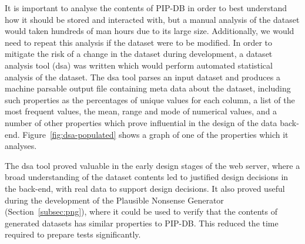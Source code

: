 It is important to analyse the contents of PIP-DB in order to best
understand how it should be stored and interacted with, but a manual
analysis of the dataset would taken hundreds of man hours due to its
large size. Additionally, we would need to repeat this analysis if the
dataset were to be modified. In order to mitigate the risk of a change
in the dataset during development, a dataset analysis tool (dsa) was
written which would perform automated statistical analysis of the
dataset. The dsa tool parses an input dataset and produces a machine
parsable output file containing meta data about the dataset, including
such properties as the percentages of unique values for each column, a
list of the most frequent values, the mean, range and mode of
numerical values, and a number of other properties which prove
influential in the design of the data
back-end. Figure~\ref{fig:dsa-populated} shows a graph of one of the
properties which it analyses.

The dsa tool proved valuable in the early design stages of the web
server, where a broad understanding of the dataset contents led to
justified design decisions in the back-end, with real data to support
design decisions. It also proved useful during the development of the
Plausible Nonsense Generator (Section~\ref{subsec:png}), where it
could be used to verify that the contents of generated datasets has
similar properties to PIP-DB. This reduced the time required to
prepare tests significantly.


